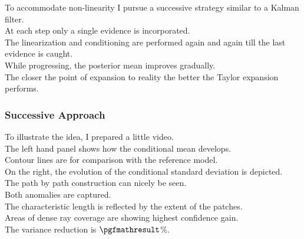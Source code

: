 \documentclass[aspectratio=169, t, 10pt,
    ]{beamer}
\begin{document}
To accommodate non-linearity I pursue a successive strategy similar to a Kalman filter.
\\
At each step only a single evidence is incorporated.
\\
The linearization and conditioning are performed again and again till the last evidence is caught.
\\
While progressing, the posterior mean improves gradually.
\\
The closer the point of expansion to reality the better the Taylor expansion performs.


\begin{frame}
    \frametitle{Successive Approach}
    \begin{center}
    \end{center}
\end{frame}

To illustrate the idea, I prepared a little video.
\\
The left hand panel shows how the conditional mean develops.
\\
Contour lines are for comparison with the reference model.
\\
On the right, the evolution of the conditional standard deviation is depicted.
\\[2mm]

The path by path construction can nicely be seen.
\\
Both anomalies are captured.
\\
The characteristic length is reflected by the extent of the patches.
\\
Areas of dense ray coverage are showing highest confidence gain.
\\
The variance reduction is $\pgfmathresult$\%.
\end{document}
